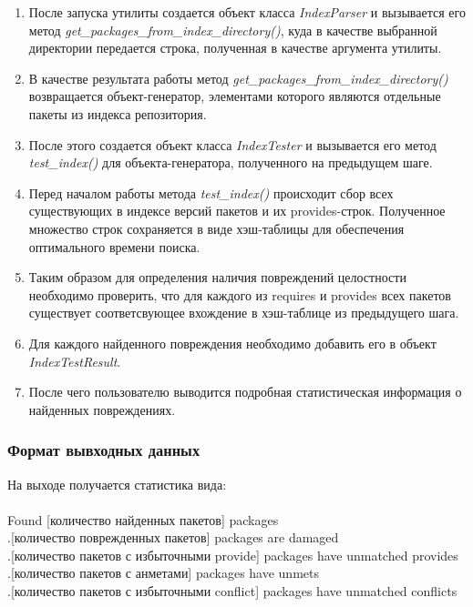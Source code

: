 \begin{enumerate}
\item
После запуска утилиты создается объект класса \textit{IndexParser} и вызывается его метод
\textit{get\_packages\_from\_index\_directory()}, куда в качестве выбранной
директории передается строка, полученная в качестве аргумента утилиты.

\item
В качестве результата работы метод \textit{get\_packages\_from\_index\_directory()}
возвращается объект-генератор, элементами которого являются отдельные пакеты из индекса 
репозитория.

\item
После этого создается объект класса \textit{IndexTester} и вызывается его метод
\textit{test\_index()} для объекта-генератора, полученного на предыдущем шаге.

\item
Перед началом работы метода \textit{test\_index()} происходит сбор всех существующих
в индексе версий пакетов и их provides-строк. Полученное множество строк сохраняется
в виде хэш-таблицы для обеспечения оптимального времени поиска.

\item
Таким образом для определения наличия повреждений целостности
необходимо проверить, что для каждого из requires и provides всех пакетов
существует соответсвующее вхождение в хэш-таблице из предыдущего шага.

\item 
Для каждого найденного повреждения необходимо добавить его в объект \textit{IndexTestResult}.

\item
После чего пользователю выводится подробная статистическая информация о найденных повреждениях.

\end{enumerate}

\subsubsection{Формат вывходных данных}

На выходе получается статистика вида:\\
\\
Found [количество найденных пакетов] packages\\
.[количество поврежденных пакетов] packages are damaged\\
.[количество пакетов с избыточными provide] packages have unmatched provides\\
.[количество пакетов с анметами] packages have unmets\\
.[количество пакетов с избыточными conflict] packages have unmatched conflicts\\


